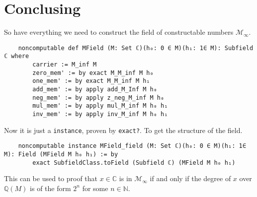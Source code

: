 \section{Conclusing}

So have everything we need to construct the field of constructable numbers $\mathcal{M}_{\infty}$.
\begin{lstlisting}
    noncomputable def MField (M: Set ℂ)(h₀: 0 ∈ M)(h₁: 1∈ M): Subfield ℂ where
        carrier := M_inf M
        zero_mem' := by exact M_M_inf M h₀
        one_mem' := by exact M_M_inf M h₁
        add_mem' := by apply add_M_Inf M h₀
        neg_mem' := by apply z_neg_M_inf M h₀
        mul_mem' := by apply mul_M_inf M h₀ h₁
        inv_mem' := by apply inv_M_inf M h₀ h₁
\end{lstlisting}

Now it is just a \verb|instance|, proven by \verb|exact?|. To get the structure of the field.
\begin{lstlisting}
    noncomputable instance MField_field (M: Set ℂ)(h₀: 0 ∈ M)(h₁: 1∈ M): Field (MField M h₀ h₁) := by
        exact SubfieldClass.toField (Subfield ℂ) (MField M h₀ h₁)
\end{lstlisting}

This can be used to proof that $x\in \mathbb{C}$ is in $\mathcal{M}_{\infty}$ if and only if the degree of $x$ over $\mathbb{Q}(M)$ is of the form $2^n$ for some $n\in \mathbb{N}$.